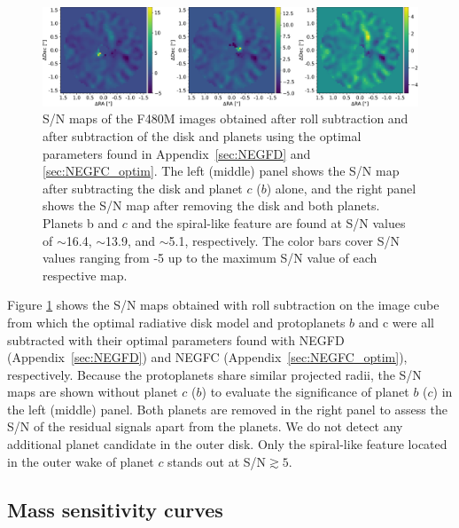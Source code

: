 \documentclass[longauth]{aa}
\begin{document}
\begin{appendix}
    \begin{figure}
    \centering
    \includegraphics[width=\textwidth]{SNRmaps_F480M.pdf}
    \caption{S/N maps of the F480M images obtained after roll subtraction and after subtraction of the disk and planets using the optimal parameters found in Appendix~\ref{sec:NEGFD} and \ref{sec:NEGFC_optim}. The left (middle) panel shows the S/N map after subtracting the disk and planet $c$ ($b$) alone, and the right panel shows the S/N map after removing the disk and both planets. Planets b and $c$ and the spiral-like feature are found at S/N values of $\sim$16.4, $\sim$13.9, and $\sim$5.1, respectively. The color bars cover S/N values ranging from -5 up to the maximum S/N value of each respective map.}
    \label{fig:SNRmaps}
    \end{figure}
    
Figure \ref{fig:SNRmaps} shows the S/N maps obtained with roll subtraction on the image cube from which the optimal radiative disk model and protoplanets $b$ and c were all subtracted with their optimal parameters found with NEGFD (Appendix~\ref{sec:NEGFD}) and NEGFC (Appendix~\ref{sec:NEGFC_optim}), respectively.
Because the protoplanets share similar projected radii, the S/N maps are shown without planet $c$ ($b$) to evaluate the significance of planet $b$ ($c$) in the left (middle) panel. Both planets are removed in the right panel to assess the S/N of the residual signals apart from the planets. We do not detect any additional planet candidate in the outer disk. Only the spiral-like feature located in the outer wake of planet $c$ stands out at S/N$\gtrsim5$. 

\subsection{Mass sensitivity curves}


\end{appendix}
\end{document}
